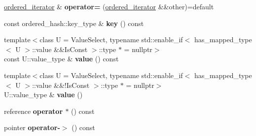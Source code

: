 \begin{DoxyCompactItemize}
\mbox{\hyperlink{classtsl_1_1detail__ordered__hash_1_1ordered__hash_1_1ordered__iterator}{ordered\+\_\+iterator}} \& {\bfseries operator=} (\mbox{\hyperlink{classtsl_1_1detail__ordered__hash_1_1ordered__hash_1_1ordered__iterator}{ordered\+\_\+iterator}} \&\&other)=default
\item 
\mbox{\label{classtsl_1_1detail__ordered__hash_1_1ordered__hash_1_1ordered__iterator_ae30bf95a1bce0d8cb10a9a9aa6691e6a}} 
const ordered\+\_\+hash\+::key\+\_\+type \& {\bfseries key} () const
\item 
\mbox{\label{classtsl_1_1detail__ordered__hash_1_1ordered__hash_1_1ordered__iterator_aac545e7d44349a5c63a1e9bcbe5a6af3}} 
{\footnotesize template$<$class U  = Value\+Select, typename std\+::enable\+\_\+if$<$ has\+\_\+mapped\+\_\+type$<$ U $>$\+::value \&\&\+Is\+Const $>$\+::type $\ast$  = nullptr$>$ }\\const U\+::value\+\_\+type \& {\bfseries value} () const
\item 
\mbox{\label{classtsl_1_1detail__ordered__hash_1_1ordered__hash_1_1ordered__iterator_a05c89b583badfba63cc5e365e8a88d49}} 
{\footnotesize template$<$class U  = Value\+Select, typename std\+::enable\+\_\+if$<$ has\+\_\+mapped\+\_\+type$<$ U $>$\+::value \&\&!\+Is\+Const $>$\+::type $\ast$  = nullptr$>$ }\\U\+::value\+\_\+type \& {\bfseries value} ()
\item 
\mbox{\label{classtsl_1_1detail__ordered__hash_1_1ordered__hash_1_1ordered__iterator_a61e669f1cd14632eb829f1931eabcdd4}} 
reference {\bfseries operator $\ast$} () const
\item 
\mbox{\label{classtsl_1_1detail__ordered__hash_1_1ordered__hash_1_1ordered__iterator_acb1484acea245c852aa1ab1df1527ef8}} 
pointer {\bfseries operator-\/$>$} () const
\item 
\mbox{\label{classtsl_1_1detail__ordered__hash_1_1ordered__hash_1_1ordered__iterator_a9f46a471d21d0bf675b6461f322dbe78}} 

\end{DoxyCompactItemize}
